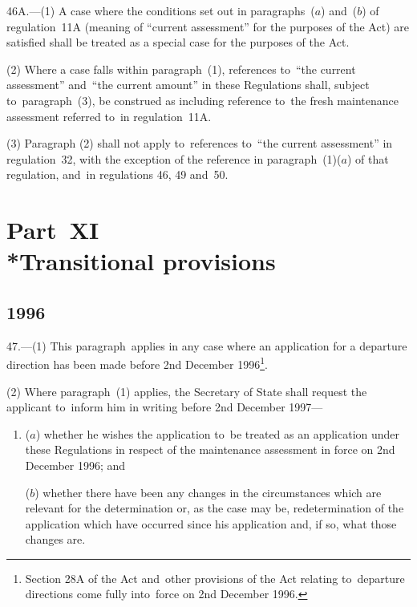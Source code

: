 \documentclass[12pt,a4paper]{article}
\begin{document}
46A.—(1) A case where the conditions set out in paragraphs~($a$) 
and~($b$)  %
of regulation~11A (meaning of “current assessment” for the purposes of the Act) are satisfied shall be treated as a special case for the purposes of the Act.

(2) Where a case falls within paragraph~(1), references to~“the current assessment” and~“the current amount” in these Regulations shall, subject to~paragraph~(3), be construed as including reference to~the fresh maintenance assessment referred to~in regulation~11A.

(3) Paragraph (2) shall not apply to~references to~“the current assessment” in regulation~32, with the exception of the reference in paragraph~(1)($a$) of that regulation, and~in regulations 46, 49 and~50.


\section[Part~XI --- Transitional provisions]{Part~XI\\*Transitional provisions}

\renewcommand\parthead{--- Part~XI}

\subsection[47. Transitional provisions—application before 2nd
December 1996]{\sloppy {} 1996}

47.—(1) This paragraph~applies in any case where an application for
a departure direction has been made before 2nd December 1996\footnote{\frenchspacing Section 28A of the Act and~other provisions of the Act relating to~departure directions come fully into~force on 2nd December 1996.}.

(2) Where paragraph~(1) applies, the Secretary of State shall request the
applicant to~inform him in writing before 2nd December 1997—
\begin{enumerate}\item[]
($a$) whether he wishes the application to~be treated as an application under these
Regulations in respect of the maintenance assessment in force on 2nd December
1996; and

($b$) whether there have been any changes in the circumstances which are relevant
for the determination or, as the case may be, redetermination of the application
which have occurred since his application and, if so, what those changes are.
\end{enumerate}
\end{document}
